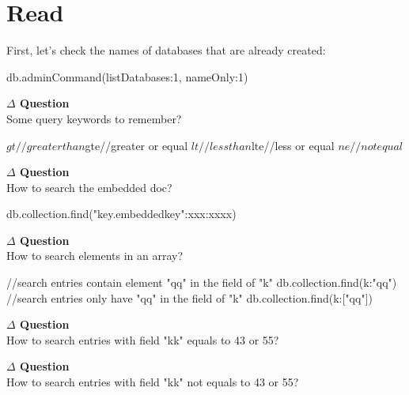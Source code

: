 \documentclass[12pt]{article}
\newenvironment{que}
    { \begin{mdframed}[backgroundcolor=green!20] \textbf{$\Delta$ Question} \\}
    {  \end{mdframed}}
\begin{document}
\section{Read}
First, let's check the names of databases that are already created:
\begin{code}
db.adminCommand({listDatabases:1, nameOnly:1})
\end{code}
\begin{que}
Some query keywords to remember?
\end{que}
\begin{code}
$gt//greater than
$gte//greater or equal
$lt//less than
$lte//less or equal
$ne//not equal
$
\end{code}
\begin{que}
How to search the embedded doc?
\end{que}
\begin{code}
db.collection.find({"key.embeddedkey":{xxx:xxxx}})
\end{code}
\begin{que}
How to search elements in an array?
\end{que}
\begin{code}
//search entries contain element "qq" in the field of "k"
db.collection.find({k:"qq"})
//search entries only have "qq" in the field of "k"
db.collection.find({k:["qq"]})
\end{code}
\begin{que}
How to search entries with field "kk" equals to 43 or 55?
\end{que}
\begin{code}
db.collection.find({kk:{$in:[43,55]})
\end{code}
\begin{que}
How to search entries with field "kk" not equals to 43 or 55?
\end{que}
\begin{code}
db.collection.find({kk:{$nin:[43,55]})
\end{code}
\end{document}
